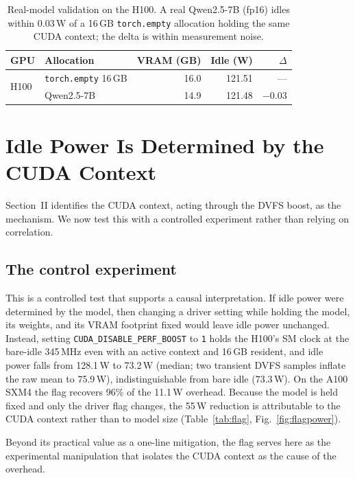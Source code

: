 \documentclass[conference]{IEEEtran}
\newcommand{\perfboost}{\texttt{\mbox{CUDA}\_\hspace{0pt}\mbox{DISABLE}\_\hspace{0pt}\mbox{PERF}\_\hspace{0pt}\mbox{BOOST}}\xspace}
\begin{document}
\begin{table}[t]
\caption{Real-model validation on the H100. A real Qwen2.5-7B (fp16) idles within 0.03\,W of a 16\,GB \texttt{torch.empty} allocation holding the same CUDA context; the delta is within measurement noise.}
\label{tab:validation}
\centering
\small
\begin{tabular}{@{}llrrr@{}}
\toprule
\textbf{GPU} & \textbf{Allocation} & \textbf{VRAM (GB)} & \textbf{Idle (W)} & $\Delta$ \\
\midrule
\multirow{2}{*}{H100} & \texttt{torch.empty} 16\,GB & 16.0 & 121.51 & --- \\
 & Qwen2.5-7B & 14.9 & 121.48 & $-$0.03 \\
\bottomrule
\end{tabular}
\end{table}

\section{Idle Power Is Determined by the CUDA Context}
\label{sec:control-plane}
Section~II identifies the CUDA context, acting through the DVFS boost, as the mechanism. We now test this with a controlled experiment rather than relying on correlation.

\subsection{The control experiment}
This is a controlled test that supports a causal interpretation. If idle power were determined by the model, then changing a driver setting while holding the model, its weights, and its VRAM footprint fixed would leave idle power unchanged. Instead, setting \perfboost to \texttt{1} holds the H100's SM clock at the bare-idle 345\,MHz even with an active context and 16\,GB resident, and idle power falls from 128.1\,W to 73.2\,W (median; two transient DVFS samples inflate the raw mean to 75.9\,W), indistinguishable from bare idle (73.3\,W). On the A100 SXM4 the flag recovers 96\% of the 11.1\,W overhead. Because the model is held fixed and only the driver flag changes, the 55\,W reduction is attributable to the CUDA context rather than to model size (Table~\ref{tab:flag}, Fig.~\ref{fig:flagpower}).

Beyond its practical value as a one-line mitigation, the flag serves here as the experimental manipulation that isolates the CUDA context as the cause of the overhead.
\end{document}
